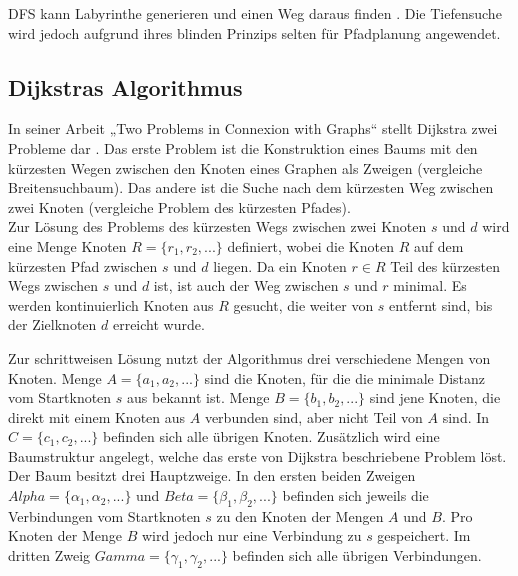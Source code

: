 DFS kann Labyrinthe generieren und einen Weg daraus finden \cite{KB15}. Die Tiefensuche wird jedoch aufgrund ihres blinden Prinzips selten für Pfadplanung angewendet.


\subsection{Dijkstras Algorithmus}
In seiner Arbeit „Two Problems in Connexion with Graphs“ stellt Dijkstra zwei Probleme dar \cite{Dijkstra.1959}. Das erste Problem ist die Konstruktion eines Baums mit den kürzesten Wegen zwischen den Knoten eines Graphen als Zweigen (vergleiche Breitensuchbaum). Das andere ist die Suche nach dem kürzesten Weg zwischen zwei Knoten (vergleiche Problem des kürzesten Pfades). \\
Zur Lösung des Problems des kürzesten Wegs zwischen zwei Knoten $s$ und $d$ wird eine Menge Knoten $R = \{r_1, r_2, ...\}$ definiert, wobei die Knoten $R$ auf dem kürzesten Pfad zwischen $s$ und $d$ liegen. Da ein Knoten $r \in R$ Teil des kürzesten Wegs zwischen $s$ und $d$ ist, ist auch der Weg zwischen $s$ und $r$ minimal. Es werden kontinuierlich Knoten aus $R$ gesucht, die weiter von $s$ entfernt sind, bis der Zielknoten $d$ erreicht wurde.

Zur schrittweisen Lösung nutzt der Algorithmus drei verschiedene Mengen von Knoten. Menge $A = \{a_1, a_2, ...\}$ sind die Knoten, für die die minimale Distanz vom Startknoten $s$ aus bekannt ist. Menge $B = \{b_1, b_2, ...\}$ sind jene Knoten, die direkt mit einem Knoten aus $A$ verbunden sind, aber nicht Teil von $A$ sind. In $C = \{c_1, c_2, ...\}$ befinden sich alle übrigen Knoten.
Zusätzlich wird eine Baumstruktur angelegt, welche das erste von Dijkstra beschriebene Problem löst. Der Baum besitzt drei Hauptzweige. In den ersten beiden Zweigen $Alpha = \{\alpha_1, \alpha_2, ...\}$ und $Beta = \{\beta_1, \beta_2, ...\}$ befinden sich jeweils die Verbindungen vom Startknoten $s$ zu den Knoten der Mengen $A$ und $B$. Pro Knoten der Menge $B$ wird jedoch nur eine Verbindung zu $s$ gespeichert. Im dritten Zweig $Gamma = \{\gamma_1, \gamma_2, ...\}$ befinden sich alle übrigen Verbindungen.

